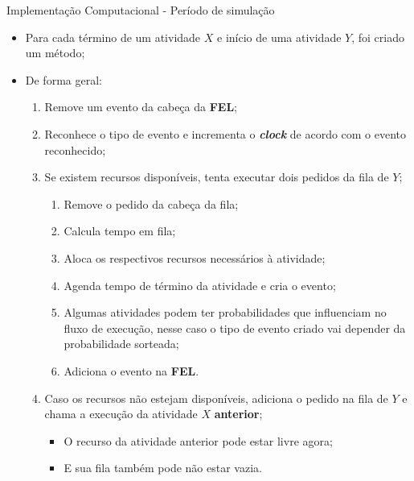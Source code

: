 \documentclass[xcolor=dvipsnames]{beamer}
\let\olditem=\item%
\renewcommand{\item}{\olditem \justifying}%
\begin{document}
\begin{frame}{Implementação Computacional - Período de simulação}
\label{fram:Atividades}
\fontsize{10pt}{7.2}\selectfont
	
	\begin{itemize}
		\item Para cada término de um atividade $X$ e início de uma atividade $Y$, foi criado um método;
		\item De forma geral:
		      \begin{enumerate}
		      	\item Remove um evento da cabeça da \textbf{FEL};
		      	\item Reconhece o tipo de evento e incrementa o \textbf{\textit{clock}} de acordo com o evento reconhecido;
		      	\item Se existem recursos disponíveis, tenta executar dois pedidos da fila de $Y$;
		      	      \begin{enumerate}
		      	      	\item Remove o pedido da cabeça da fila;
		      	      	\item Calcula tempo em fila;
		      	      	\item Aloca os respectivos recursos necessários à atividade;
		      	      	\item Agenda tempo de término da atividade e cria o evento;
		      	      	\item Algumas atividades podem ter probabilidades que influenciam no fluxo de execução, nesse caso o tipo de evento criado vai depender da probabilidade sorteada;
		      	      	\item Adiciona o evento na \textbf{FEL}.
		      	      \end{enumerate}
		      	\item Caso os recursos não estejam disponíveis, adiciona o pedido na fila de $Y$ e chama a execução da atividade $X$ \textbf{anterior};
		      	      \begin{itemize}
		      	      	\item O recurso da atividade anterior pode estar livre agora;
		      	      	\item E sua fila também pode não estar vazia.
		      	      \end{itemize}
		      \end{enumerate}
	\end{itemize}
\end{frame}
		
\end{document}
